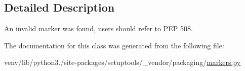 \subsection{Detailed Description}
\begin{DoxyVerb}An invalid marker was found, users should refer to PEP 508.
\end{DoxyVerb}
 

The documentation for this class was generated from the following file\+:\begin{DoxyCompactItemize}
\item 
venv/lib/python3./site-\/packages/setuptools/\+\_\+vendor/packaging/\hyperlink{setuptools_2__vendor_2packaging_2markers_8py}{markers.\+py}\end{DoxyCompactItemize}
